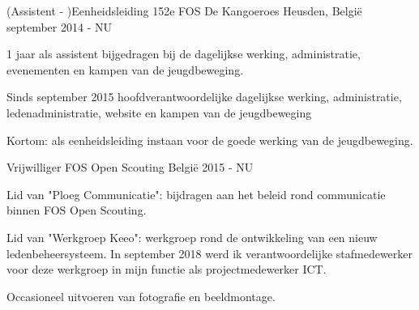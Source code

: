 


\begin{cventries}


\cventry
{(Assistent - )Eenheidsleiding} %
{152e FOS De Kangoeroes} %
{Heusden, België} %
{september 2014 - NU} %
{ %
\begin{cvitems}
\item {1 jaar als assistent bijgedragen bij de dagelijkse werking, administratie, evenementen en kampen van de jeugdbeweging.}
\item {Sinds  september 2015 hoofdverantwoordelijke dagelijkse werking, administratie, ledenadministratie, website en kampen van de jeugdbeweging}
\item {Kortom: als eenheidsleiding instaan voor de goede werking van de jeugdbeweging.}
\end{cvitems}
}

\cventry
{Vrijwilliger} %
{FOS Open Scouting} %
{België} %
{2015 - NU} %
{ %
	\begin{cvitems}
		\item {Lid van "Ploeg Communicatie": bijdragen aan het beleid rond communicatie binnen FOS Open Scouting.}
		\item {Lid van "Werkgroep Keeo": werkgroep rond de ontwikkeling van een nieuw ledenbeheersysteem. In september 2018 werd ik verantwoordelijke stafmedewerker voor deze werkgroep in mijn functie als projectmedewerker ICT.}
		\item {Occasioneel uitvoeren van fotografie en beeldmontage.}		
	\end{cvitems}
}







\end{cventries}
